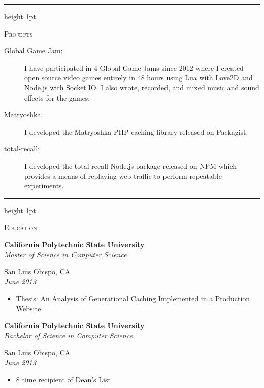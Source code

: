 \documentclass[letterpaper,10pt]{article}
\newcommand{\ressectiondivider}{
   \textcolor{black}{\hrule height 1pt}
}
\newcommand{\resitem}[1]{\item #1 \vspace{-2pt}}
\newcommand{\ressubheading}[4]{
   \begin{minipage}[t]{10cm}
      \flushleft
      \large{\textbf{#1}}\\
      \normalsize{\textit{#3}}\\
   \end{minipage}
   \hfill
   \begin{minipage}[t]{5cm}
      \flushright
      #2\\
      \textit{#4}\\
   \end{minipage}
}
\newenvironment{ressection}[1]{
   \vspace{12pt}
   \ressectiondivider
   \vspace{5pt}
   \begin{minipage}[t]{2.75cm}
      \flushleft
      \Large{\textrm{\textsc{#1}}}
   \end{minipage}
   \hfill
   \begin{minipage}[t]{16cm}
      \flushleft
}{
   \end{minipage}
}
\begin{document}
\begin{ressection}{Projects}
   \begin{description}
      \item[Global Game Jam:] I have participated in 4 Global Game Jams
         since 2012 where I created open source video games entirely in 48
         hours using Lua with Love2D and Node.js with Socket.IO. I also wrote,
         recorded, and mixed music and sound effects for the games.
      \item[Matryoshka:] I developed the Matryoshka PHP caching library released on Packagist.
      \item[total-recall:] I developed the total-recall Node.js package released on NPM which
         provides a means of replaying web traffic to perform repeatable experiments.
   \end{description}
\end{ressection}

\begin{ressection}{Education}
   \ressubheading{California Polytechnic State University}{San Luis Obispo, CA}{Master of Science in Computer Science}{June 2013}
   \begin{itemize}
      \resitem{Thesis: An Analysis of Generational Caching Implemented in a Production Website}
   \end{itemize}
   \ressubheading{California Polytechnic State University}{San Luis Obispo, CA}{Bachelor of Science in Computer Science}{June 2013}
   \begin{itemize}
      \resitem{8 time recipient of Dean's List}
   \end{itemize}
\end{ressection}
\end{document}
